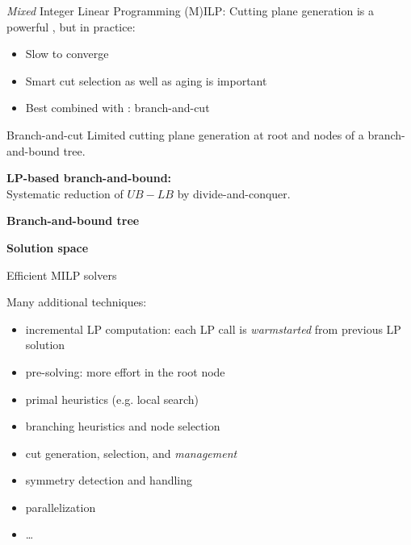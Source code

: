 \documentclass{cons-beamer}
\begin{document}
\begin{frame}{\textit{Mixed} Integer Linear Programming (M)ILP: }
	Cutting plane generation is a powerful , but in practice:
	\begin{itemize}
		\item Slow to converge
		\item Smart cut selection as well as aging is important
		\item Best combined with : branch-and-cut
	\end{itemize}
	
\end{frame}


\begin{frame}{Branch-and-cut}
	Limited cutting plane generation at root and nodes of a branch-and-bound tree.
	\vfill
	
	\textbf{LP-based branch-and-bound:}\\
	Systematic reduction of $UB-LB$ by divide-and-conquer. %
	\bigskip
	
	\begin{minipage}[t]{.45\textwidth}
		\centering
		\textbf{Branch-and-bound tree}
		
		\vspace*{3em}
		
	\end{minipage}
	\hfill
	\begin{minipage}[t]{.45\textwidth}
		\centering
		\textbf{Solution space}
		\vspace*{-1em}
		
		
	\end{minipage}
	\vfill
	
\end{frame}



\begin{frame}{Efficient MILP solvers}
	
	Many additional techniques:
	\begin{itemize}
		\item incremental LP computation: each LP call is \textit{warmstarted} from previous LP solution
		\item pre-solving: more effort in the root node
		\item primal heuristics (e.g. local search)
		\item branching heuristics and node selection
		\item cut generation, selection, and \textit{management}
		\item symmetry detection and handling
		\item parallelization
		\item \ldots
	\end{itemize}
\end{frame}
\end{document}
